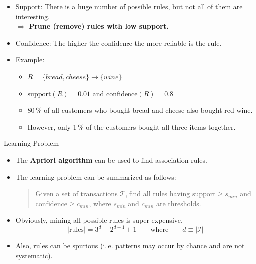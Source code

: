 \begin{frame}
	\begin{itemize}
		\item Support: There is a huge number of possible rules, but not all of them are interesting. \\
			$\Rightarrow$ \textbf{Prune (remove) rules with low support.}
		\item Confidence: The higher the confidence the more reliable is the rule.
		\item Example:
		\begin{itemize}
			\item $R = \{ bread, cheese \} \rightarrow \{ wine \}$
			\item $\text{support}(R) = 0.01$ and $\text{confidence}(R) = 0.8$
			\item 80\,\% of all customers who bought bread and cheese also bought red wine.
			\item However, only 1\,\% of the customers bought all three items together.
		\end{itemize}
	\end{itemize}
\end{frame}



\begin{dwHeaderFrame}{Learning Problem}
	\begin{itemize}
		\item The \textbf{Apriori algorithm} can be used to find association rules.
		\item The learning problem can be summarized as follows:
		\begin{quote}
			Given a set of transactions $\mathcal{T}$, find all rules having $\text{support} \ge s_{min}$ and $\text{confidence} \ge c_{min}$,
			where $s_{min}$ and $c_{min}$ are thresholds.
		\end{quote}
		\item Obviously, mining all possible rules is super expensive.
		\begin{equation}
			\vert \text{rules} \vert = 3^d - 2^{d+1} + 1 \qquad\text{where}\qquad d \equiv \vert \mathcal{I} \vert
		\end{equation}
		\item Also, rules can be spurious (i.\,e. patterns may occur by chance and are not systematic).
	\end{itemize}
\end{dwHeaderFrame}


